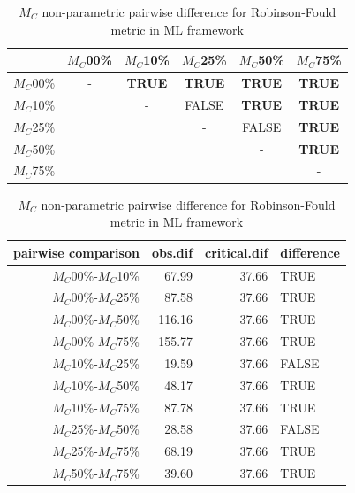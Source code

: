 \documentclass[12pt,letterpaper]{article}
\begin{document}
\begin{table}
\caption{$M_C$ non-parametric pairwise difference for Robinson-Fould metric in ML framework} %
\centering
\begin{tabular}{c|ccccc}
    \hline
              & $M_C$00\% & $M_C$10\% & $M_C$25\% & $M_C$50\% & $M_C$75\% \\
    \hline
    $M_C$00\% & - & \textbf{TRUE} & \textbf{TRUE} & \textbf{TRUE} & \textbf{TRUE}\\
    $M_C$10\% & & - & FALSE & \textbf{TRUE} & \textbf{TRUE} \\
    $M_C$25\% & & & - & FALSE & \textbf{TRUE} \\
    $M_C$50\% & & & & - & \textbf{TRUE} \\
    $M_C$75\% & & & & & - \\
    \hline
\end{tabular}
\centering
\begin{tabular}{rrrl}
 pairwise comparison & obs.dif & critical.dif & difference \\ 
  \hline
  $M_C$00\%-$M_C$10\% & 67.99 & 37.66 & TRUE \\ 
  $M_C$00\%-$M_C$25\% & 87.58 & 37.66 & TRUE \\ 
  $M_C$00\%-$M_C$50\% & 116.16 & 37.66 & TRUE \\ 
  $M_C$00\%-$M_C$75\% & 155.77 & 37.66 & TRUE \\ 
  $M_C$10\%-$M_C$25\% & 19.59 & 37.66 & FALSE \\ 
  $M_C$10\%-$M_C$50\% & 48.17 & 37.66 & TRUE \\ 
  $M_C$10\%-$M_C$75\% & 87.78 & 37.66 & TRUE \\ 
  $M_C$25\%-$M_C$50\% & 28.58 & 37.66 & FALSE \\ 
  $M_C$25\%-$M_C$75\% & 68.19 & 37.66 & TRUE \\ 
  $M_C$50\%-$M_C$75\% & 39.60 & 37.66 & TRUE \\ 
   \hline
\end{tabular}
\label{ML_RF-MC_results}
\end{table}
\end{document}
